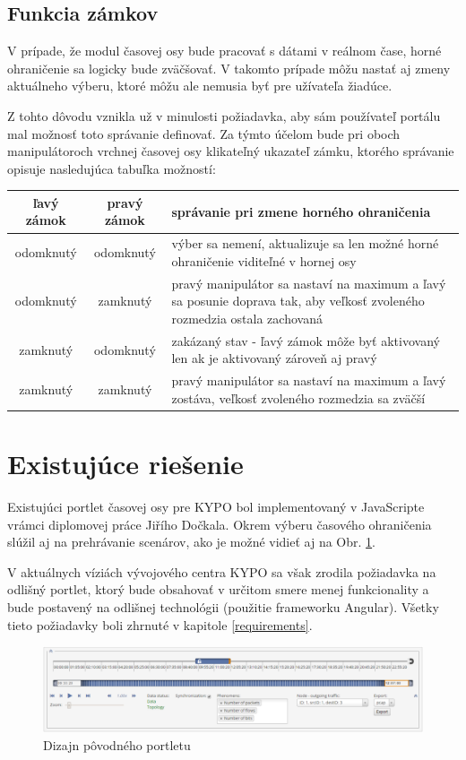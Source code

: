 \documentclass[
  digital, %
  twoside, %
  notable,   %
  nolof,   %
  nolot,   %
]{fithesis3}
\begin{document}
\subsection{Funkcia zámkov}
\label{sec:lockers}
V prípade, že modul časovej osy bude pracovať s dátami v reálnom čase, horné ohraničenie sa logicky bude zväčšovať. V takomto prípade môžu nastať aj zmeny aktuálneho výberu, ktoré môžu ale nemusia byť pre užívateľa žiadúce.

Z tohto dôvodu vznikla už v minulosti požiadavka, aby sám používateľ portálu mal možnosť toto správanie definovať. Za týmto účelom bude pri oboch manipulátoroch vrchnej časovej osy klikateľný ukazateľ zámku, ktorého správanie opisuje nasledujúca tabuľka možností:
\begin{center}
  \begin{tabular}{ | c | c || p{6.5cm} | }
    \hline
    ľavý zámok & pravý zámok & správanie pri zmene horného ohraničenia \\ \hline \hline
    odomknutý & odomknutý & výber sa nemení, aktualizuje sa len možné horné ohraničenie viditeľné v hornej osy \\ \hline
    odomknutý & zamknutý & pravý manipulátor sa nastaví na maximum a ľavý sa posunie doprava tak, aby veľkosť zvoleného rozmedzia ostala zachovaná\\ \hline
    zamknutý & odomknutý & zakázaný stav - ľavý zámok môže byť aktivovaný len ak je aktivovaný zároveň aj pravý \\ \hline
    zamknutý & zamknutý & pravý manipulátor sa nastaví na maximum a ľavý zostáva, veľkosť zvoleného rozmedzia sa zväčší \\ \hline
  \end{tabular}
\end{center}

\section{Existujúce riešenie}
Existujúci portlet časovej osy pre KYPO bol implementovaný v JavaScripte vrámci diplomovej práce Jiřího Dočkala\cite{dockal2016webovy}. Okrem výberu časového ohraničenia slúžil aj na prehrávanie scenárov, ako je možné vidieť aj na Obr. \ref{old_portlet}.

V aktuálnych víziách vývojového centra KYPO sa však zrodila požiadavka na odlišný portlet, ktorý bude obsahovať v určitom smere menej funkcionality a bude postavený na odlišnej technológii (použitie frameworku Angular). Všetky tieto požiadavky boli zhrnuté v kapitole \ref{requirements}.
\begin{figure}
	\center
	\includegraphics[width=1.0\linewidth]{old_portlet}
	\caption{Dizajn pôvodného portletu\cite{dockal2016webovy}}
	\label{old_portlet}
\end{figure}
\end{document}
